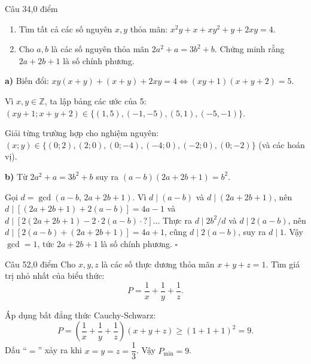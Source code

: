 \begin{de_cau}{Câu 3}{4,0 điểm}
\begin{enumerate}[label=\alph*)]
  \item Tìm tất cả các số nguyên $x, y$ thỏa mãn: $x^2y + x + xy^2 + y + 2xy = 4$.
  \item Cho $a, b$ là các số nguyên thỏa mãn $2a^2 + a = 3b^2 + b$. Chứng minh rằng $2a + 2b + 1$ là số chính phương.
\end{enumerate}
\end{de_cau}

\begin{loi_giai_cau}
\textbf{a)} Biến đổi: $xy(x+y) + (x+y) + 2xy = 4 \Leftrightarrow (xy+1)(x+y+2) = 5$.

Vì $x, y \in \mathbb{Z}$, ta lập bảng các ước của 5:
$(xy+1; x+y+2) \in \{(1,5),(-1,-5),(5,1),(-5,-1)\}$.

Giải từng trường hợp cho nghiệm nguyên: $(x;y)\in\{(0;2),(2;0),(0;-4),(-4;0),(-2;0),(0;-2)\}$ (và các hoán vị).

\textbf{b)} Từ $2a^2+a = 3b^2+b$ suy ra $(a-b)(2a+2b+1) = b^2$.

Gọi $d = \gcd(a-b,\, 2a+2b+1)$. Vì $d \mid (a-b)$ và $d \mid (2a+2b+1)$, nên $d \mid [(2a+2b+1)+2(a-b)] = 4a-1$ và $d \mid [2(2a+2b+1) - 2\cdot 2(a-b) \cdot ?]$... Thực ra $d \mid 2b^2/d$ và $d \mid 2(a-b)$, nên $d \mid [2(a-b) + (2a+2b+1)] = 4a+1$, cũng $d \mid 2(a-b)$, suy ra $d \mid 1$. Vậy $\gcd = 1$, tức $2a+2b+1$ là số chính phương. $\square$
\end{loi_giai_cau}

\begin{de_cau}{Câu 5}{2,0 điểm}
Cho $x, y, z$ là các số thực dương thỏa mãn $x + y + z = 1$. Tìm giá trị nhỏ nhất của biểu thức:
\[P = \dfrac{1}{x} + \dfrac{1}{y} + \dfrac{1}{z}.\]
\end{de_cau}

\begin{loi_giai_cau}
Áp dụng bất đẳng thức Cauchy-Schwarz:
\[P = \left(\frac{1}{x}+\frac{1}{y}+\frac{1}{z}\right)(x+y+z) \ge (1+1+1)^2 = 9.\]
Dấu ``$=$'' xảy ra khi $x = y = z = \dfrac{1}{3}$. Vậy $P_{\min} = \boxed{9}$.
\end{loi_giai_cau}
